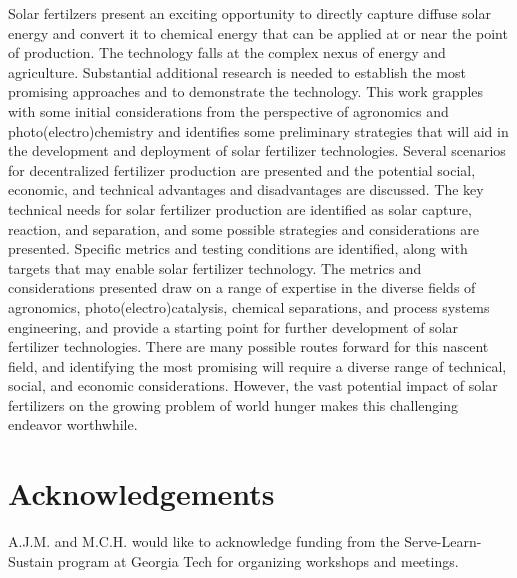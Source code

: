 Solar fertilzers present an exciting opportunity to directly capture diffuse solar energy and convert it to chemical energy that can be applied at or near the point of production. The technology falls at the complex nexus of energy and agriculture. Substantial additional research is needed to establish the most promising approaches and to demonstrate the technology. This work grapples with some initial considerations from the perspective of agronomics and photo(electro)chemistry and identifies some preliminary strategies that will aid in the development and deployment of solar fertilizer technologies. Several scenarios for decentralized fertilizer production are presented and the potential social, economic, and technical advantages and disadvantages are discussed. The key technical needs for solar fertilizer production are identified as solar capture, reaction, and separation, and some possible strategies and considerations are presented. Specific metrics and testing conditions are identified, along with targets that may enable solar fertilizer technology. The metrics and considerations presented draw on a range of expertise in the diverse fields of agronomics, photo(electro)catalysis, chemical separations, and process systems engineering, and provide a starting point for further development of solar fertilizer technologies. There are many possible routes forward for this nascent field, and identifying the most promising will require a diverse range of technical, social, and economic considerations. However, the vast potential impact of solar fertilizers on the growing problem of world hunger makes this challenging endeavor worthwhile.

\section*{Acknowledgements}
A.J.M. and M.C.H. would like to acknowledge funding from the Serve-Learn-Sustain program at Georgia Tech for organizing workshops and meetings.


